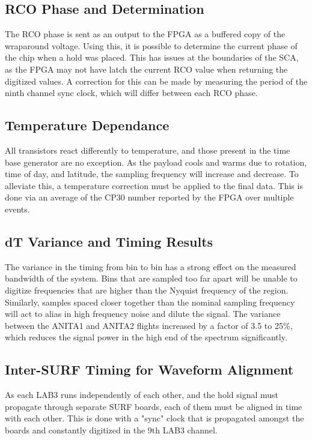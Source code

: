 	\subsection{RCO Phase and Determination}
		The RCO phase is sent as an output to the FPGA as a buffered copy of the wraparound voltage.  Using this, it is possible to determine the current phase of the chip when a hold was placed.  This has issues at the boundaries of the SCA, as the FPGA may not have latch the current RCO value when returning the digitized values.  A correction for this can be made by measuring the period of the ninth channel sync clock, which will differ between each RCO phase.

	\subsection{Temperature Dependance}	
		All transistors react differently to temperature, and those present in the time base generator are no exception.  As the payload cools and warms due to rotation, time of day, and latitude, the sampling frequency will increase and decrease.  To alleviate this, a temperature correction must be applied to the final data. This is done via an average of the CP30 number reported by the FPGA over multiple events.
	\subsection{dT Variance and Timing Results}	
		The variance in the timing from bin to bin has a strong effect on the measured bandwidth of the system.  Bins that are sampled too far apart will be unable to digitize frequencies that are higher than the Nyquist frequency of the region.  Similarly, samples spaced closer together than the nominal sampling frequency will act to alias in high frequency noise and dilute the signal.  The variance between the ANITA1 and ANITA2 flights increased by a factor of 3.5 to 25\%, which reduces the signal power in the high end of the spectrum significantly.
		
	\subsection{Inter-SURF Timing for Waveform Alignment}	
		As each LAB3 runs independently of each other, and the hold signal must propagate through separate SURF boards, each of them must be aligned in time with each other.  This is done with a "sync" clock that is propagated amongst the boards and constantly digitized in the 9th LAB3 channel.



